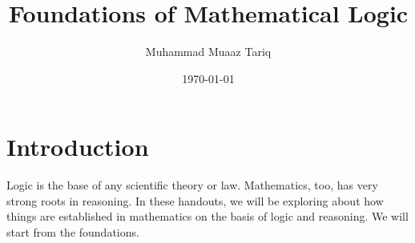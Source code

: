 \documentclass[a4paper]{article}
\title{Foundations of Mathematical Logic}
\author{Muhammad Muaaz Tariq}
\date{\today}
\theoremstyle{definition}
\theoremstyle{definition}
\theoremstyle{definition}
\theoremstyle{definition}
\theoremstyle{definition}
\theoremstyle{definition}
\begin{document}
\maketitle

\section{Introduction}
Logic is the base of any scientific theory or law. Mathematics, too, has very strong roots in reasoning. In these handouts, we will be exploring about how things are established in mathematics on the basis of logic and reasoning. We will start from the foundations.
\end{document}
